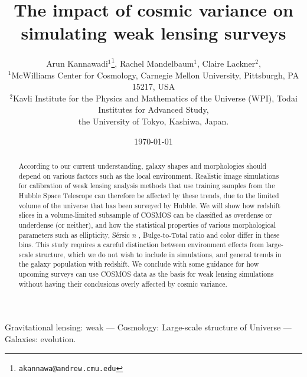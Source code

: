 \documentclass[twocolumn,useAMS,usenatbib]{mn2e}
\title[WL simulation]{The impact of cosmic variance on simulating weak lensing surveys}
\author[Kannawadi et al.]
{Arun Kannawadi$^1$\thanks{\tt akannawa@andrew.cmu.edu}, 
Rachel Mandelbaum$^1$,
Claire Lackner$^2$, 
\\$^1$McWilliams Center for Cosmology, Carnegie Mellon University, Pittsburgh, PA 15217, USA
\\$^2$Kavli Institute for the Physics and Mathematics of the Universe (WPI), Todai Institutes for Advanced Study,\\ the University of Tokyo, Kashiwa, Japan.
}
\date{\today}
\newcommand{\rachel}[1]{}
\newcommand{\arun}[1]{}
\newcommand{\sersicn}{S\'{e}rsic $n$ }
\newcommand{\btt}{Bulge-to-Total }
\begin{document}

\maketitle

\begin{abstract}
According to our current understanding, galaxy shapes and morphologies should depend on various factors such as the local environment. Realistic image simulations for calibration of weak lensing analysis methods that use training samples from the Hubble Space Telescope can therefore be affected by these trends, due to the limited volume of the universe that has been surveyed by Hubble. We will show how redshift slices in a volume-limited subsample of COSMOS can be classified as overdense or underdense (or neither), and how the statistical properties of various morphological parameters such as ellipticity, \sersicn, \btt ratio and color differ in these bins. This study requires a careful distinction between environment effects from large-scale structure, which we do not wish to include in simulations, and general trends in the galaxy population with redshift. We conclude with some guidance for how upcoming surveys can use COSMOS data as the basis for weak lensing simulations without having their conclusions overly affected by cosmic variance.  
\rachel{I have some comments on this abtract, but prefer to do all
  revision of the abstract at the end once the paper is finalized.}
\end{abstract}

\begin{keywords}
 Gravitational lensing: weak --- Cosmology: Large-scale structure of Universe --- Galaxies: evolution.
\end{keywords}

\end{document}
